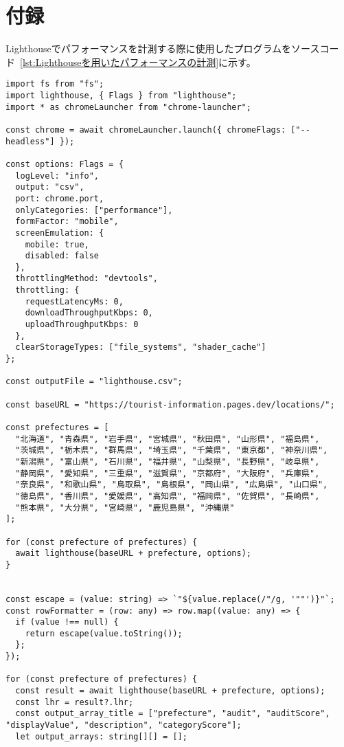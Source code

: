 \section*{付録}
Lighthouseでパフォーマンスを計測する際に使用したプログラムをソースコード~\ref{lst:Lighthouseを用いたパフォーマンスの計測}に示す。
\begin{lstlisting}[caption={Lighthouseを用いたパフォーマンスの計測},label={lst:Lighthouseを用いたパフォーマンスの計測}]
import fs from "fs";
import lighthouse, { Flags } from "lighthouse";
import * as chromeLauncher from "chrome-launcher";

const chrome = await chromeLauncher.launch({ chromeFlags: ["--headless"] });

const options: Flags = {
  logLevel: "info",
  output: "csv",
  port: chrome.port,
  onlyCategories: ["performance"],
  formFactor: "mobile",
  screenEmulation: {
    mobile: true,
    disabled: false
  },
  throttlingMethod: "devtools",
  throttling: {
    requestLatencyMs: 0,
    downloadThroughputKbps: 0,
    uploadThroughputKbps: 0
  },
  clearStorageTypes: ["file_systems", "shader_cache"]
};

const outputFile = "lighthouse.csv";

const baseURL = "https://tourist-information.pages.dev/locations/";

const prefectures = [
  "北海道", "青森県", "岩手県", "宮城県", "秋田県", "山形県", "福島県",
  "茨城県", "栃木県", "群馬県", "埼玉県", "千葉県", "東京都", "神奈川県",
  "新潟県", "富山県", "石川県", "福井県", "山梨県", "長野県", "岐阜県",
  "静岡県", "愛知県", "三重県", "滋賀県", "京都府", "大阪府", "兵庫県",
  "奈良県", "和歌山県", "鳥取県", "島根県", "岡山県", "広島県", "山口県",
  "徳島県", "香川県", "愛媛県", "高知県", "福岡県", "佐賀県", "長崎県",
  "熊本県", "大分県", "宮崎県", "鹿児島県", "沖縄県"
];

for (const prefecture of prefectures) {
  await lighthouse(baseURL + prefecture, options);
}


const escape = (value: string) => `"${value.replace(/"/g, '""')}"`;
const rowFormatter = (row: any) => row.map((value: any) => {
  if (value !== null) {
    return escape(value.toString());
  };
});

for (const prefecture of prefectures) {
  const result = await lighthouse(baseURL + prefecture, options);
  const lhr = result?.lhr;
  const output_array_title = ["prefecture", "audit", "auditScore", "displayValue", "description", "categoryScore"];
  let output_arrays: string[][] = [];


\end{lstlisting}
